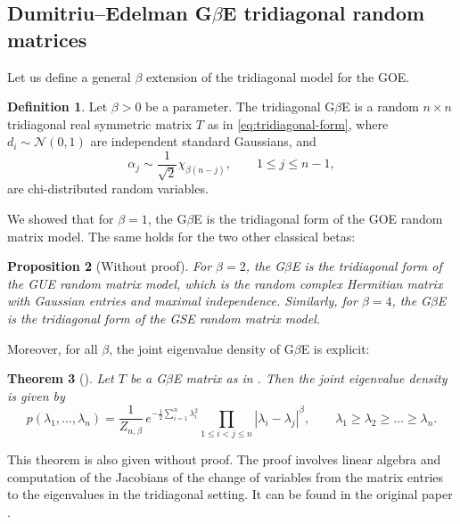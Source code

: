\documentclass[letterpaper,11pt,oneside,reqno]{article}
\numberwithin{equation}{section}
\newtheorem{proposition}{Proposition}[section]
\newtheorem{theorem}[proposition]{Theorem}
\theoremstyle{definition}
\newtheorem{definition}[proposition]{Definition}
\begin{document}
\subsection{Dumitriu--Edelman G$\beta$E tridiagonal random matrices}

Let us define a general $\beta$ extension of the tridiagonal model for the
GOE.

\begin{definition}
	\label{def:tridiagonal-model-general-beta}
	Let $\beta>0$ be a parameter.
	The tridiagonal G$\beta$E is a random $n\times n$
	tridiagonal real symmetric
	matrix $T$ as in
	\eqref{eq:tridiagonal-form},
	where $d_i\sim \mathcal{N}(0,1)$ are independent standard Gaussians,
	and
	\begin{equation*}
		\alpha_j\sim \frac{1}{\sqrt 2}\chi_{\beta(n-j)},\qquad
		1\le j\le n-1,
	\end{equation*}
	are chi-distributed random variables.
\end{definition}

We showed that for $\beta=1$,
the G$\beta$E is the tridiagonal form of the GOE random matrix model.
The same holds for the two other classical betas:
\begin{proposition}[Without proof]
	\label{prop:tridiagonal-model-beta-classical}
	For $\beta=2$, the G$\beta$E is the tridiagonal form of the GUE random matrix model,
	which is the random complex Hermitian matrix with Gaussian entries and maximal
	independence. Similarly, for $\beta=4$,
	the G$\beta$E is the tridiagonal form of the GSE random matrix model.
\end{proposition}


Moreover, for all $\beta$, the joint eigenvalue density of G$\beta$E is
explicit:
\begin{theorem}[\cite{dumitriu2002matrix}]
	\label{thm:DE-joint-eigenvalue-density}
	Let \(T\) be a G$\beta$E matrix as in .
	Then the joint eigenvalue density is given by
	\begin{equation*}
		p(\lambda_1,\ldots,\lambda_n)
		=
		\frac{1}{Z_{n,\beta}}\,
		e^{-\frac{1}{2}\sum_{i=1}^n \lambda_i^2}
		\prod_{1\le i<j\le n}|\lambda_i - \lambda_j|^\beta,
		\qquad
		\lambda_1\ge \lambda_2\ge \ldots \ge \lambda_n.
	\end{equation*}
\end{theorem}

This theorem is also given without proof. The proof involves
linear algebra and computation of the Jacobians of the
change of variables from the matrix entries to the
eigenvalues in the tridiagonal setting.  It can be found in
the original paper \cite{dumitriu2002matrix}.
\end{document}

